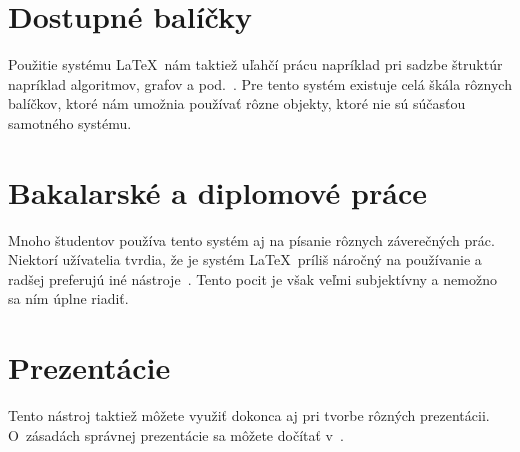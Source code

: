 \documentclass[11pt,a4paper]{article}
\begin{document}
\section{Dostupné balíčky}
Použitie systému \LaTeX\  nám taktiež uľahčí prácu napríklad pri
sadzbe štruktúr napríklad algoritmov, grafov a pod.~\cite{Simpson}.
Pre tento systém existuje celá škála rôznych balíčkov,
ktoré nám umožnia používať rôzne objekty, ktoré nie sú súčasťou
samotného systému.

\section{Bakalarské a diplomové práce}
Mnoho študentov používa tento systém aj na písanie rôznych záverečných prác. Niektorí užívatelia tvrdia, že je systém \LaTeX\ príliš
náročný na používanie a radšej preferujú iné nástroje~\cite{OpenWetWare}. Tento pocit je však veľmi subjektívny
a nemožno sa ním úplne riadiť.

\section{Prezentácie}
Tento nástroj taktiež môžete využiť dokonca aj pri tvorbe rôzných
prezentácii. O~zásadách správnej prezentácie sa môžete dočítať
v~\cite{Yaffe}.

\newpage

\renewcommand{\refname}{Použitá literatura}

\end{document}

